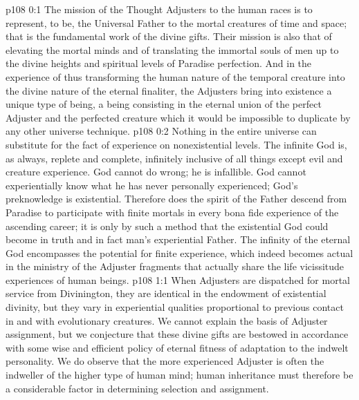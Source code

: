 \author{Solitary Messenger}
\vs p108 0:1 The mission of the Thought Adjusters to the human races is to represent, to be, the Universal Father to the mortal creatures of time and space; that is the fundamental work of the divine gifts. Their mission is also that of elevating the mortal minds and of translating the immortal souls of men up to the divine heights and spiritual levels of Paradise perfection. And in the experience of thus transforming the human nature of the temporal creature into the divine nature of the eternal finaliter, the Adjusters bring into existence a unique type of being, a being consisting in the eternal union of the perfect Adjuster and the perfected creature which it would be impossible to duplicate by any other universe technique.
\vs p108 0:2 \pc Nothing in the entire universe can substitute for the fact of experience on nonexistential levels. The infinite God is, as always, replete and complete, infinitely inclusive of all things except evil and creature experience. God cannot do wrong; he is infallible. God cannot experientially know what he has never personally experienced; God’s preknowledge is existential. Therefore does the spirit of the Father descend from Paradise to participate with finite mortals in every bona fide experience of the ascending career; it is only by such a method that the existential God could become in truth and in fact man’s experiential Father. The infinity of the eternal God encompasses the potential for finite experience, which indeed becomes actual in the ministry of the Adjuster fragments that actually share the life vicissitude experiences of human beings.
\vs p108 1:1 When Adjusters are dispatched for mortal service from Divinington, they are identical in the endowment of existential divinity, but they vary in experiential qualities proportional to previous contact in and with evolutionary creatures. We cannot explain the basis of Adjuster assignment, but we conjecture that these divine gifts are bestowed in accordance with some wise and efficient policy of eternal fitness of adaptation to the indwelt personality. We do observe that the more experienced Adjuster is often the indweller of the higher type of human mind; human inheritance must therefore be a considerable factor in determining selection and assignment.
